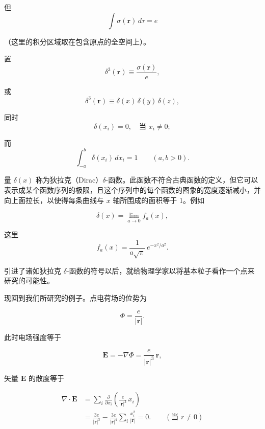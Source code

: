\documentclass[11pt,a4paper,oneside]{ctexbook}
\newcommand{\ve}[1]{\bm{#1}}
\begin{document}
但
\begin{equation*}
\int \sigma(\ve{r})\, d\tau = e
\end{equation*}

（这里的积分区域取在包含原点的全空间上）。

置
\begin{equation*}
\delta^{3}(\ve{r}) \equiv \frac{\sigma(\ve{r})}{e},
\end{equation*}

或
\begin{equation*}
\delta^{3}(\ve{r}) \equiv \delta(x)\, \delta(y)\, \delta(z),
\end{equation*}

同时
\begin{equation*}
\delta(x_i) = 0, \quad \text{当 } x_i \neq 0;
\end{equation*}

而
\begin{equation*}
\int_{-a}^{b} \delta(x_i)\, dx_i = 1 \qquad (a, b > 0).
\end{equation*}

量 $\delta(x)$ 称为狄拉克（Dirac）$\delta$-函数。此函数不符合古典函数的定义，但它可以表示成某个函数序列的极限，且这个序列中的每个函数的图象的宽度逐渐减小，并向上面拉长，以使得每条曲线与 $x$ 轴所围成的面积等于 1。例如

\begin{equation*}
\delta(x) = \lim_{a \to 0} f_a(x),
\end{equation*}

这里
\begin{equation*}
f_a(x) = \frac{1}{a\sqrt{\pi}}\, e^{-x^{2}/a^{2}}.
\end{equation*}

引进了诸如狄拉克 $\delta$-函数的符号以后，就给物理学家以将基本粒子看作一个点来研究的可能性。

现回到我们所研究的例子。点电荷场的位势为

\begin{equation*}
\Phi = \frac{e}{|\ve{r}|}.
\end{equation*}

此时电场强度等于

\begin{equation*}
\ve{E} = -\nabla\Phi = \frac{e}{|\ve{r}|^{3}}\, \ve{r},
\end{equation*}

矢量 $\ve{E}$ 的散度等于

\begin{equation*}
\begin{aligned}
\nabla \cdot \ve{E} &= \sum_{i} \frac{\partial}{\partial x_i} \left(\frac{e}{|\ve{r}|^{3}}\, x_i\right)\\
&= \frac{3e}{|\ve{r}|^{3}} - \frac{3e}{|\ve{r}|^{4}} \sum_{i} \frac{x_i^{2}}{|\ve{r}|} = 0. \qquad (\text{当 } r \neq 0)
\end{aligned}
\end{equation*}
\end{document}
